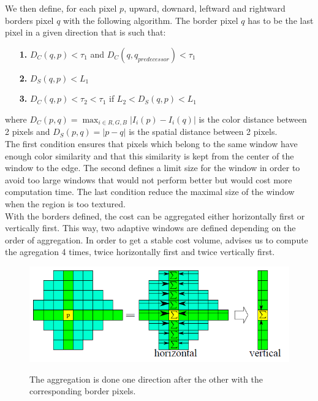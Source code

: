 \documentclass{article}
\begin{document}
We then define, for each pixel $p$, upward, downard, leftward and rightward borders pixel $q$ with the following algorithm. The border pixel $q$ has to be the last pixel in a given direction that is such that:
\begin{itemize}
	\item[\textbf{1. }]$D_C(q, p) < \tau_1$ and $D_C(q, q_{predecessor}) < \tau_1$
	\item[\textbf{2. }]$D_S(q, p) < L_1$
	\item[\textbf{3. }]$D_C(q, p) < \tau_2 < \tau_1$ if $L_2 <  D_S(q, p) < L_1$
\end{itemize}
where $D_C(p, q) = \max_{i \in R, G, B} |I_i(p) - I_i(q)|$ is the color distance between 2 pixels and  $D_S(p, q) = |p - q|$ is the spatial distance between 2 pixels.\\
The first condition ensures that pixels which belong to the same window have enough color similarity and that this similarity is kept from the center of the window to the edge. The second defines a limit size for the window in order to avoid too large windows that would not perform better but would cost more computation time. The last condition reduce the maximal size of the window when the region is too textured.\\
With the borders defined, the cost can be aggregated either horizontally first or vertically first. This way, two adaptive windows are defined depending on the order of aggregation. In order to get a stable cost volume, \cite{adCensus} advises us to compute the agregation 4 times, twice horizontally first and twice vertically first.\\

\begin{figure}[h]
\begin{center}	
\includegraphics[scale=0.7]{Images/cost_aggregation.png}
	\label{cost_aggregation}
	\caption{ The aggregation is done one direction after the other with the corresponding border pixels.}
\end{center}
\end{figure}
\end{document}
